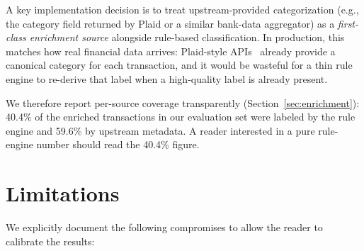 \documentclass[conference]{IEEEtran}
\begin{document}
A key implementation decision is to treat upstream-provided
categorization (e.g., the category field returned by Plaid or a
similar bank-data aggregator) as a \emph{first-class enrichment
source} alongside rule-based classification. In production, this
matches how real financial data arrives: Plaid-style
APIs~\cite{plaid} already provide a canonical category for each
transaction, and it would be wasteful for a thin rule engine to
re-derive that label when a high-quality label is already present.

We therefore report per-source coverage transparently
(Section~\ref{sec:enrichment}): 40.4\% of the enriched transactions
in our evaluation set were labeled by the rule engine and 59.6\% by
upstream metadata. A reader interested in a pure rule-engine number
should read the 40.4\% figure.

\section{Limitations}
\label{sec:limitations}

We explicitly document the following compromises to allow the
reader to calibrate the results:
\end{document}
